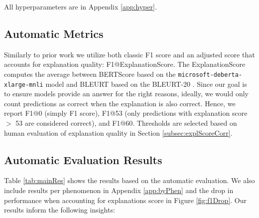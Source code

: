 All hyperparameters are in Appendix \ref{app:hyper}.  

\subsection{Automatic Metrics} \label{subsec:autoMetrics}
Similarly to prior work \cite{chakrabarty-etal-2022-flute} we utilize both classic F1 score and an adjusted score that accounts for explanation quality: F1@ExplanationScore.
The ExplanationScore computes the average between BERTScore \cite{bertscore} based on the \texttt{microsoft-deberta-xlarge-mnli} model \cite{he2021deberta, williams-etal-2018-broad} and BLEURT \cite{sellam-etal-2020-bleurt} based on the BLEURT-20 \cite{pu2021learning}.
Since our goal is to ensure models provide an answer for the right reasons, ideally, we would only count predictions as correct when the explanation is also correct. Hence, we report F1@0 (simply F1 score), F1@53 (only predictions with explanation score $>$ 53 are considered correct), and F1@60. Thresholds are selected based on human evaluation of explanation quality in Section \ref{subsec:explScoreCorr}.

\subsection{Automatic Evaluation Results} \label{subsec:autoMetricsres}
Table \ref{tab:mainRes} shows the results based on the automatic evaluation. We also include results per phenomenon in Appendix \ref{app:byPhen} and the drop in performance when accounting for explanations score in Figure \ref{fig:f1Drop}. Our results inform the following insights: 


